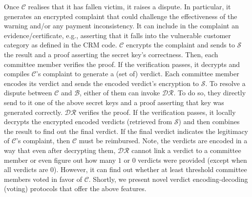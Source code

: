 

Once $\mathcal{C}$ realises that it has fallen victim, it  raises a dispute. In particular, it  generates  an encrypted complaint that could  challenge the effectiveness of the warning and/or any payment inconsistency. It can   include in the complaint an  evidence/certificate, e.g., asserting that it falls into  the vulnerable customer category as defined in the CRM code. $\mathcal{C}$ encrypts the complaint and  sends to $\mathcal{S}$ the result and a proof asserting the secret key's correctness.  Then, each committee member verifies the proof. If the verification passes, it decrypts and compiles $\mathcal{C}$'s complaint to generate a (set of) verdict. Each committee member encodes its verdict and sends the   encoded verdict's encryption to $\mathcal{S}$. To resolve a dispute between $\mathcal{C}$ and $\mathcal{B}$, either of them can  invoke $\mathcal{DR}$. To do so, they  directly send to it one of the above secret keys and a proof asserting that key was generated correctly.   $\mathcal{DR}$ verifies the proof. If the verification passes, it locally decrypts the encrypted encoded verdicts (retrieved from $\mathcal{S}$) and then combines the result to find out the final verdict.  If the final verdict indicates the legitimacy of  $\mathcal{C}$'s complaint, then $\mathcal{C}$ must be reimbursed.   Note, the verdicts are encoded in  a way that even after decrypting them, $\mathcal{DR}$ cannot link a verdict to a committee member or even figure out how many $1$ or $0$ verdicts were provided  (except when all verdicts are $0$). However, it can find out whether at least threshold committee members voted  in favor of $\mathcal{C}$. Shortly, we present  novel verdict encoding-decoding (voting) protocols that offer the above features. 










